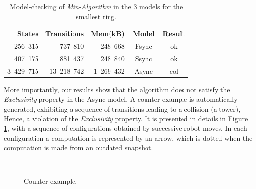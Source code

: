 \begin{table}[htbp] 
\centering
\setlength{\tabcolsep}{4pt}
\begin{tabular}{|r|r|r|c|c|} 
\hline 
\textbf{States} & \textbf{Transitions} & \textbf{Mem(kB)}&
\textbf{Model} & \textbf{Result} \\ 
\hline 256\, 315 & 737\, 810 &~~248\, 668 & ~Fsync~ & ok \\ 
\hline 407\, 175 & 881\, 437 & 248\, 840 & Ssync &ok\\ 
\hline 3\, 429\, 715 & 13\, 218\, 742 & 1\, 269\, 432 & Async & col \\
\hline 
\end{tabular}
\caption{Model-checking of \emph{Min-Algorithm} in the
3 models for the smallest ring.} 
\label{tab: min} 
\end{table}

More importantly, our results show that the algorithm does not satisfy
the \emph{Exclusivity} property in the Async model. A counter-example
is automatically generated, exhibiting a sequence of transitions
leading to a collision (a tower), Hence, a violation of the
\emph{Exclusivity} property. It is presented in details in Figure
\ref{fig:CE}, with a sequence of configurations obtained by successive
robot moves. In each configuration a computation is represented by an
arrow, which is dotted when the computation is made from an outdated
snapshot.

\begin{figure}[htbp] 
\centering
{}\\\vspace{-2em}
\caption{Counter-example.} 
\label{fig:CE} 
\end{figure} 
 
